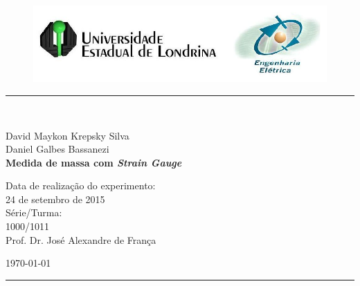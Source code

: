 \begin{titlepage}
\begin{center}
\begin{figure}[h]
\includegraphics[scale=0.76]{img/topdotitulo.png}
\end{figure}
\rule{\columnwidth}{1.5mm}
\

\large David Maykon Krepsky Silva\\
\large Daniel Galbes Bassanezi\\

\vspace{4cm}
{\bf \Large Medida de massa com \textit{Strain Gauge}}
\vspace{3.5cm}

\begin{flushright}
Data de realização do experimento:\\
24 de setembro de 2015\\
Série/Turma:\\
1000/1011\\
Prof. Dr. José Alexandre de França
\end{flushright}

\vspace{3.2cm}
\today

\rule{\columnwidth}{1.3mm}
\end{center}
\end{titlepage}
\blankpage